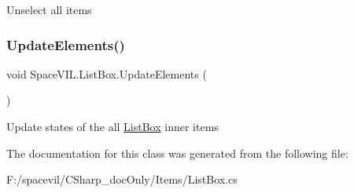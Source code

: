 Unselect all items 

\mbox{\label{class_space_v_i_l_1_1_list_box_aeef6380f4eff45ac43737fbc42dcf2e1}} 
\subsubsection{\texorpdfstring{Update\+Elements()}{UpdateElements()}}
{\footnotesize\ttfamily void Space\+V\+I\+L.\+List\+Box.\+Update\+Elements (\begin{DoxyParamCaption}{ }\end{DoxyParamCaption})}



Update states of the all \mbox{\hyperlink{class_space_v_i_l_1_1_list_box}{List\+Box}} inner items 



The documentation for this class was generated from the following file\+:\begin{DoxyCompactItemize}
\item 
F\+:/spacevil/\+C\+Sharp\+\_\+doc\+Only/\+Items/List\+Box.\+cs\end{DoxyCompactItemize}
